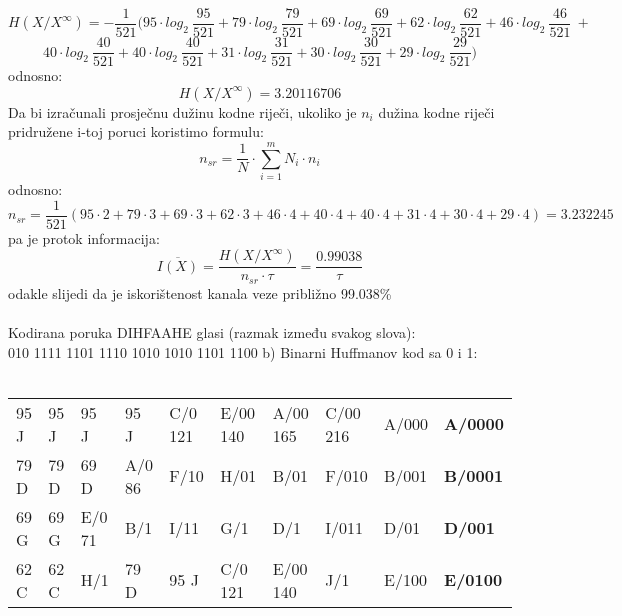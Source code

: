 \documentclass[12pt]{article}
\begin{document}
\begin{enumerate}
\begin{equation*}
    H(X/X^\infty) = - \frac{1}{521}(95 \cdot log_2~\frac{95}{521} +	79 \cdot log_2~\frac{79}{521} +
    69 \cdot log_2~\frac{69}{521} + 62 \cdot log_2~\frac{62}{521} + 46 \cdot log_2~\frac{46}{521}~+
\end{equation*}
\begin{equation*}
	40 \cdot log_2~\frac{40}{521} + 40 \cdot log_2~\frac{40}{521} + 31 \cdot log_2~\frac{31}{521} +
	30 \cdot log_2~\frac{30}{521} + 29 \cdot log_2~\frac{29}{521})
\end{equation*}
odnosno:
\begin{equation*}
    H(X/X^\infty) = 3.20116706
\end{equation*}
Da bi izračunali prosječnu dužinu kodne riječi, ukoliko je $n_i$ dužina
kodne riječi pridružene i-toj poruci koristimo formulu:
\begin{equation*}
    n_{sr} = \frac{1}{N} \cdot \sum_{i = 1}^m N_i \cdot n_i
\end{equation*}
odnosno:
\begin{equation*}
    n_{sr} = \frac{1}{521}(95 \cdot 2 + 79 \cdot 3 + 69 \cdot 3 + 62 \cdot 3 + 46 \cdot 4 + 40 \cdot 4 + 40 \cdot 4 + 31 \cdot 4 + 30 \cdot 4 + 29 \cdot 4) = 3.232245
\end{equation*}
pa je protok informacija:
\begin{equation*}
    \overline{I(X)} = \frac{H(X/X^\infty)}{n_{sr} \cdot \tau} = \frac{0.99038}{\tau}
\end{equation*}
odakle slijedi da je iskorištenost kanala veze približno 99.038\% \\
\\
Kodirana poruka DIHFAAHE glasi (razmak između svakog slova): \\
010 1111 1101 1110 1010 1010 1101 1100
		\newpage
b) Binarni Huffmanov kod sa 0 i 1: \\
\\
\begin{tabular}{|l|l|l|l|l|l|l|l|l|l|}
\hline
95 J & 95 J   & 95 J   & 95 J   & C/0 121 & E/00 140 & A/00 165 & C/00 216 & A/000 & \textbf{A/0000} \\ \cline{1-4}
79 D & 79 D   & 69 D   & A/0 86 & F/10    & H/01     & B/01     & F/010    & B/001 & \textbf{B/0001} \\ \cline{1-3}
69 G & 69 G   & E/0 71 & B/1    & I/11    & G/1      & D/1      & I/011    & D/01  & \textbf{D/001}  \\ \cline{1-2} \cline{4-7}
62 C & 62 C   & H/1    & 79 D   & 95 J    & C/0 121  & E/00 140 & J/1      & E/100 & \textbf{E/0100} \\ \cline{1-5} \cline{8-8}

\end{tabular}
\end{enumerate}
\end{document}
